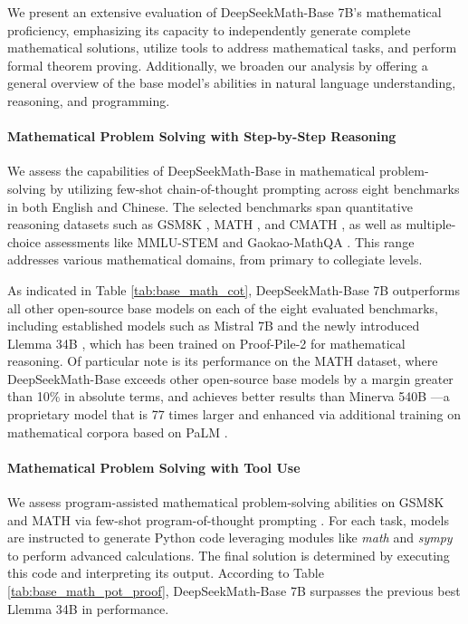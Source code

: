 \begin{itemize}[topsep=0pt]
We present an extensive evaluation of DeepSeekMath-Base 7B’s mathematical proficiency, emphasizing its capacity to independently generate complete mathematical solutions, utilize tools to address mathematical tasks, and perform formal theorem proving. Additionally, we broaden our analysis by offering a general overview of the base model's abilities in natural language understanding, reasoning, and programming.

\paragraph{Mathematical Problem Solving with Step-by-Step Reasoning}

We assess the capabilities of DeepSeekMath-Base in mathematical problem-solving by utilizing few-shot chain-of-thought prompting \citep{cot} across eight benchmarks in both English and Chinese. The selected benchmarks span quantitative reasoning datasets such as GSM8K \citep{gsm8k}, MATH \citep{MATH}, and CMATH \citep{wei2023cmath}, as well as multiple-choice assessments like MMLU-STEM \citep{mmlu} and Gaokao-MathQA \citep{agieval}. This range addresses various mathematical domains, from primary to collegiate levels.

As indicated in Table \ref{tab:base_math_cot}, DeepSeekMath-Base 7B outperforms all other open-source base models on each of the eight evaluated benchmarks, including established models such as Mistral 7B \citep{mistral} and the newly introduced Llemma 34B \citep{llemma}, which has been trained on Proof-Pile-2 \citep{llemma} for mathematical reasoning. Of particular note is its performance on the MATH dataset, where DeepSeekMath-Base exceeds other open-source base models by a margin greater than 10\% in absolute terms, and achieves better results than Minerva 540B \citep{minerva}—a proprietary model that is 77 times larger and enhanced via additional training on mathematical corpora based on PaLM \citep{palm}.

\paragraph{Mathematical Problem Solving with Tool Use} We assess program-assisted mathematical problem-solving abilities on GSM8K and MATH via few-shot program-of-thought prompting \citep{pot,pal}. For each task, models are instructed to generate Python code leveraging modules like \textit{math} and \textit{sympy} to perform advanced calculations. The final solution is determined by executing this code and interpreting its output. According to Table \ref{tab:base_math_pot_proof}, DeepSeekMath-Base 7B surpasses the previous best Llemma 34B in performance.


\end{itemize}
